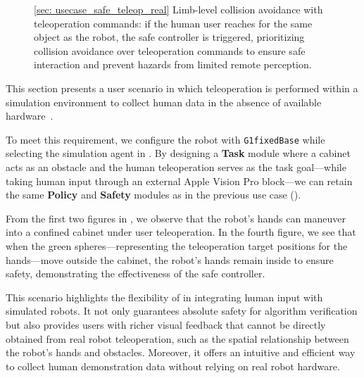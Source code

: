 \begin{figure*}[htbp]
    \centering
    \vspace{1.5cm}  %
    \vspace{4.5cm}
    \caption{\ref{sec: usecase_safe_teleop_real} Limb-level collision avoidance with teleoperation commands: if the human user reaches for the same object as the robot, the safe controller is triggered, prioritizing collision avoidance over teleoperation commands to ensure safe interaction and prevent hazards from limited remote perception.
}
    \label{Teleop}
\end{figure*}

This section presents a user scenario in which teleoperation is performed within a simulation environment to collect human data in the absence of available hardware~\cite{wang2024teleophri,nechyporenko2024armadaaugmentedrealityrobot,chen2024arcapcollectinghighqualityhuman}. 

To meet this requirement, we configure the robot with \texttt{G1fixedBase} while selecting the simulation agent in \spark. 
By designing a \textbf{Task} module where a cabinet acts as an obstacle and the human teleoperation serves as the task goal—while taking human input through an external Apple Vision Pro block—we can retain the same \textbf{Policy} and \textbf{Safety} modules as in the previous use case ().  

From the first two figures in , we observe that the robot’s hands can maneuver into a confined cabinet under user teleoperation. 
In the fourth figure, we see that when the green spheres—representing the teleoperation target positions for the hands—move outside the cabinet, the robot's hands remain inside to ensure safety, demonstrating the effectiveness of the safe controller.  

This scenario highlights the flexibility of \spark in integrating human input with simulated robots. 
It not only guarantees absolute safety for algorithm verification but also provides users with richer visual feedback that cannot be directly obtained from real robot teleoperation, such as the spatial relationship between the robot's hands and obstacles. 
Moreover, it offers an intuitive and efficient way to collect human demonstration data without relying on real robot hardware.  
